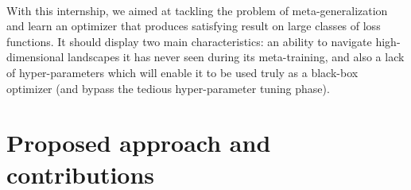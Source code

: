 {{	\paragraph{} With this internship, we aimed at tackling the problem of meta-generalization and learn an optimizer that produces satisfying result on large classes of loss functions. It should display two main characteristics: an ability to navigate high-dimensional landscapes it has never seen during its meta-training, and also a lack of hyper-parameters which will enable it to be used truly as a black-box optimizer (and bypass the tedious hyper-parameter tuning phase).
		}
	}
	
	\section{Proposed approach and contributions}
